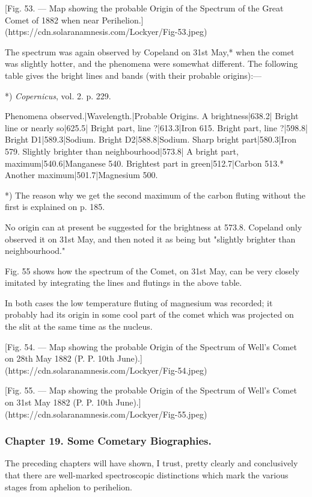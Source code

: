 \documentclass[a4paper, 12pt, oneside, polutonikogreek, english]{article}
\begin{document}
[Fig. 53. --- Map showing the probable Origin of the Spectrum of the Great Comet of 1882 when near Perihelion.](https://cdn.solaranamnesis.com/Lockyer/Fig-53.jpeg)

The spectrum was again observed by Copeland on 31st May,* when the comet was slightly hotter, and the phenomena were somewhat different. The following table gives the bright lines and bands (with their probable origins):---

*) \emph{Copernicus}, vol. 2. p. 229.

Phenomena observed.|Wavelength.|Probable Origins. 
A brightness|638.2| 
Bright line or nearly so|625.5| 
Bright part, line ?|613.3|Iron 615. 
Bright part, line ?|598.8| 
Bright D1|589.3|Sodium. 
Bright D2|588.8|Sodium. 
Sharp bright part|580.3|Iron 579. 
Slightly brighter than neighbourhood|573.8| 
A bright part, maximum|540.6|Manganese 540. 
Brightest part in green|512.7|Carbon 513.* 
Another maximum|501.7|Magnesium 500.

*) The reason why we get the second maximum of the carbon fluting without the first is explained on p. 185.

No origin can at present be suggested for the brightness at 573.8. Copeland only observed it on 31st May, and then noted it as being but "slightly brighter than neighbourhood."

Fig. 55 shows how the spectrum of the Comet, on 31st May, can be very closely imitated by integrating the lines and flutings in the above table.

In both cases the low temperature fluting of magnesium was recorded; it probably had its origin in some cool part of the comet which was projected on the slit at the same time as the nucleus.

[Fig. 54. --- Map showing the probable Origin of the Spectrum of Well's Comet on 28th May 1882 (P. P. 10th June).](https://cdn.solaranamnesis.com/Lockyer/Fig-54.jpeg)

[Fig. 55. --- Map showing the probable Origin of the Spectrum of Well's Comet on 31st May 1882 (P. P. 10th June).](https://cdn.solaranamnesis.com/Lockyer/Fig-55.jpeg)

\subsubsection{Chapter 19. Some Cometary Biographies.}

The preceding chapters will have shown, I trust, pretty clearly and conclusively that there are well-marked spectroscopic distinctions which mark the various stages from aphelion to perihelion.
\end{document}
